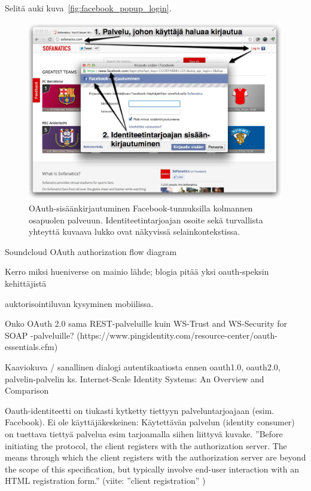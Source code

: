 \documentclass[finnish,gradu]{tktltiki}
\begin{document}
  Selitä auki kuva~\ref{fig:facebook_popup_login}.

  \begin{figure}
    \centering
    \includegraphics[width=1.0\textwidth]{images/facebook_popup_login.jpg}
    \caption{OAuth-sisäänkirjautuminen Facebook-tunnuksilla kolmannen osapuolen palveuun. Identiteetintarjoajan osoite sekä turvallista yhteyttä kuvaava lukko ovat näkyvissä selainkontekstissa.}
    \label{fig:facebook_oauth_login}
  \end{figure}


  Soundcloud OAuth authorization flow diagram %

  Kerro miksi hueniverse on mainio lähde; blogia pitää yksi oauth-speksin kehittäjistä

  auktorisointiluvan kysyminen mobiilissa.

  Onko OAuth 2.0 sama REST-palveluille kuin WS-Trust and WS-Security for SOAP -palveluille? (https://www.pingidentity.com/resource-center/oauth-essentials.cfm)

  Kaaviokuva / sanallinen dialogi autentikaatiosta ennen oauth1.0, oauth2.0, palvelin-palvelin
  ks. Internet-Scale Identity Systems: An Overview and Comparison

  Oauth-identiteetti on tiukasti kytketty tiettyyn palveluntarjoajaan (esim. Facebook).
  Ei ole käyttäjäkeskeinen: Käytettävän palvelun (identity consumer) on tuettava tiettyä palvelua esim tarjoamalla siihen liittyvä kuvake.
  ''Before initiating the protocol, the client registers with the authorization server. The means through which the client registers with the authorization
  server are beyond the scope of this specification, but typically involve end-user interaction with an HTML registration form.'' (viite: ''client registration'' \cite{ietf_oauth2})
\end{document}
